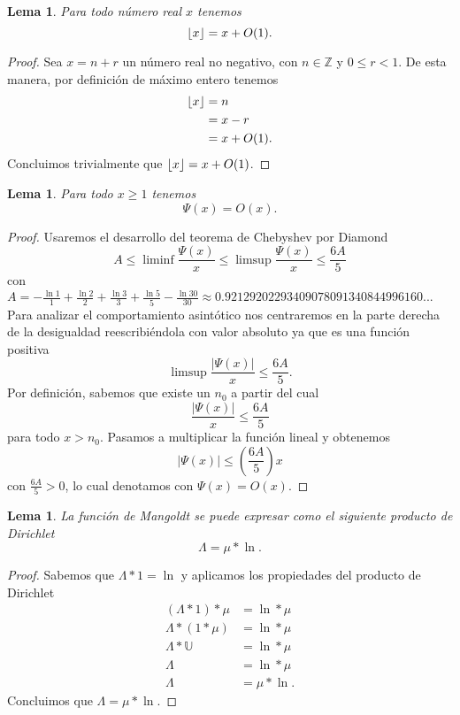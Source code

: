 \documentclass{article}
\DeclarePairedDelimiter\floor{\lfloor}{\rfloor}
\newtheorem{lemma}[theorem]{Lema}
\theoremstyle{definition}
\theoremstyle{remark}
\newcommand{\BZ}{\mathbb Z}
\begin{document}
\begin{lemma}
Para todo n\'umero real $x$ tenemos
$$\floor{x} = x + O(1).$$
\end{lemma}

\begin{proof}
Sea $x = n + r$ un n\'umero real no negativo, con $n \in \BZ$ y $0 \leq r < 1$. De esta manera, por definici\'on de m\'aximo entero tenemos
\begin{align*}
\floor{x} &= n \\
&= x - r \\
&= x + O(1).
\end{align*}
Concluimos trivialmente que $\floor{x} = x + O(1)$.
\end{proof}

\begin{lemma}
Para todo $x \geq 1$ tenemos
$$\Psi(x) = O(x).$$
\end{lemma}

\begin{proof}
Usaremos el desarrollo del teorema de Chebyshev por Diamond \cite{Diamond}
$$A \leq \liminf \frac{\Psi(x)}{x} \leq \limsup \frac{\Psi(x)}{x} \leq \frac{6A}{5}$$
con $A = -\frac{\ln 1}{1} + \frac{\ln 2}{2} + \frac{\ln 3}{3} + \frac{\ln 5}{5} - \frac{\ln 30}{30} \approx 0.92129202293409078091340844996160...$
Para analizar el comportamiento asint\'otico nos centraremos en la parte derecha de la desigualdad reescribi\'endola con valor absoluto ya que es una funci\'on positiva
$$\limsup \frac{|\Psi(x)|}{x} \leq \frac{6A}{5}.$$
Por definici\'on, sabemos que existe un $n_0$ a partir del cual
$$\frac{|\Psi(x)|}{x} \leq \frac{6A}{5}$$
para todo $x > n_0$. Pasamos a multiplicar la funci\'on lineal y obtenemos
$$|\Psi(x)| \leq \left(\frac{6A}{5}\right) x$$
con $\frac{6A}{5} > 0$, lo cual denotamos con $\Psi(x) = O(x)$.
\end{proof}

\begin{lemma}
La funci\'on de Mangoldt se puede expresar como el siguiente producto de Dirichlet
$$\Lambda = \mu * \ln.$$
\end{lemma}

\begin{proof}
Sabemos que $\Lambda * 1 = \ln$ y aplicamos los propiedades del producto de Dirichlet
\begin{align*}
(\Lambda * 1) * \mu &= \ln * \mu \\
\Lambda * (1 * \mu) &= \ln * \mu \\
\Lambda * \mathbb{U} &= \ln * \mu \\
\Lambda &= \ln * \mu \\
\Lambda &= \mu * \ln.
\end{align*}
Concluimos que $\Lambda = \mu * \ln$.
\end{proof}
\end{document}
